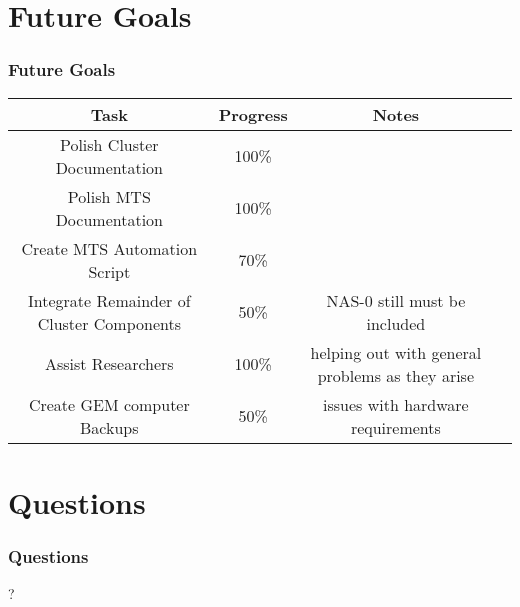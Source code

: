 \documentclass[aspectratio=169]{beamer}
\begin{document}
\section{Future Goals}

\begin{frame}

  \frametitle{Future Goals}

 \begin{center}
	\begin{tabular}{|c|c|c|c|}
		\hline
		Task & Progress & Notes\\
		\hline
		Polish Cluster Documentation & 100\% & \\
		Polish MTS Documentation & 100\% &  \\
		Create MTS Automation Script & 70\% &  \\
		Integrate Remainder of Cluster Components & 50\% & NAS-0 still must be
		included \\
		Assist Researchers & 100\% & helping out with general problems as they
		arise \\
		Create GEM computer Backups & 50\% & issues with
		hardware requirements \\
		
		\hline
	\end{tabular}
\end{center}

\end{frame}



\section{Questions}

\begin{frame}

  \frametitle{Questions}

  \begin{center}
    {\fontsize{200}{200}\selectfont ?}
  \end{center}
  
\end{frame}

\end{document}
